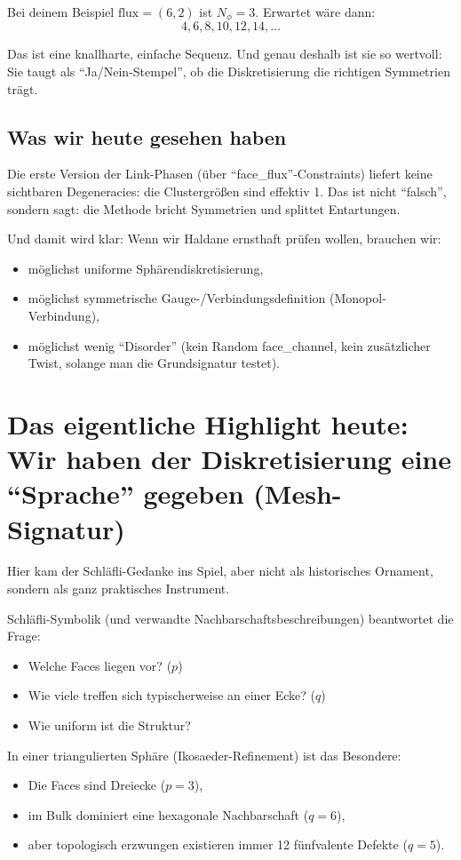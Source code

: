 \documentclass[11pt,a4paper]{article}
\begin{document}
Bei deinem Beispiel $\text{flux}=(6,2)$ ist $N_\phi = 3$. Erwartet wäre dann:
\[
4, 6, 8, 10, 12, 14, \dots
\]

Das ist eine knallharte, einfache Sequenz. Und genau deshalb ist sie so wertvoll: Sie taugt als ``Ja/Nein-Stempel'', ob die Diskretisierung die richtigen Symmetrien trägt.

\subsection{Was wir heute gesehen haben}

Die erste Version der Link-Phasen (über ``face\_flux''-Constraints) liefert keine sichtbaren Degeneracies: die Clustergrößen sind effektiv 1. Das ist nicht ``falsch'', sondern sagt: die Methode bricht Symmetrien und splittet Entartungen.

Und damit wird klar: Wenn wir Haldane ernsthaft prüfen wollen, brauchen wir:
\begin{itemize}[leftmargin=*,itemsep=0.5em]
    \item möglichst uniforme Sphärendiskretisierung,
    \item möglichst symmetrische Gauge-/Verbindungsdefinition (Monopol-Verbindung),
    \item möglichst wenig ``Disorder'' (kein Random face\_channel, kein zusätzlicher Twist, solange man die Grundsignatur testet).
\end{itemize}

\section{Das eigentliche Highlight heute: Wir haben der Diskretisierung eine ``Sprache'' gegeben (Mesh-Signatur)}

Hier kam der Schläfli-Gedanke ins Spiel, aber nicht als historisches Ornament, sondern als ganz praktisches Instrument.

Schläfli-Symbolik (und verwandte Nachbarschaftsbeschreibungen) beantwortet die Frage:
\begin{itemize}[leftmargin=*,itemsep=0.5em]
    \item Welche Faces liegen vor? ($p$)
    \item Wie viele treffen sich typischerweise an einer Ecke? ($q$)
    \item Wie uniform ist die Struktur?
\end{itemize}

In einer triangulierten Sphäre (Ikosaeder-Refinement) ist das Besondere:
\begin{itemize}[leftmargin=*,itemsep=0.5em]
    \item Die Faces sind Dreiecke ($p=3$),
    \item im Bulk dominiert eine hexagonale Nachbarschaft ($q=6$),
    \item aber topologisch erzwungen existieren immer 12 fünfvalente Defekte ($q=5$).
\end{itemize}
\end{document}
